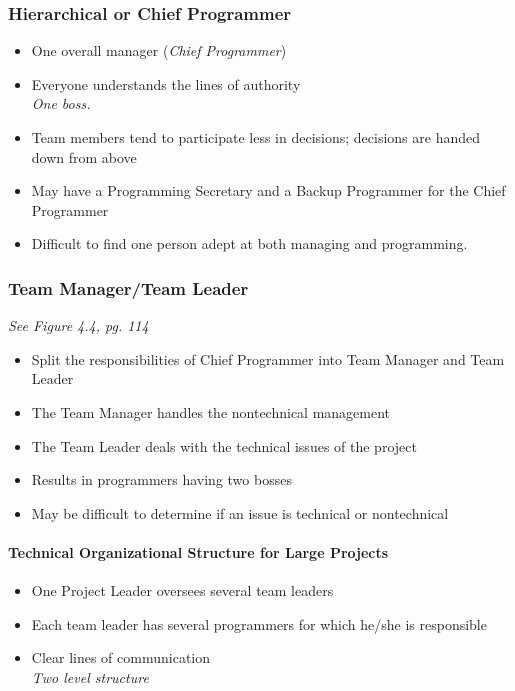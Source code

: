 \documentclass{report}
\begin{document}
				\subsubsection{Hierarchical or Chief Programmer}
					\begin{itemize}
						\item One overall manager (\textit{Chief Programmer})
						\item Everyone understands the lines of authority\\
							\textit{One boss.}
						\item Team members tend to participate less in decisions; decisions are handed down from above
						\item May have a Programming Secretary and a Backup Programmer for the Chief Programmer
						\item Difficult to find one person adept at both managing and programming.
					\end{itemize}
				\subsubsection{Team Manager/Team Leader}
					\textit{See Figure 4.4, pg. 114}
					\begin{itemize}
						\item Split the responsibilities of Chief Programmer into Team Manager and Team Leader
						\item The Team Manager handles the nontechnical management
						\item The Team Leader deals with the technical issues of the project
						\item Results in programmers having two bosses
						\item May be difficult to determine if an issue is technical or nontechnical
					\end{itemize}
					\paragraph{Technical Organizational Structure for Large Projects}
						\begin{itemize}
							\item One Project Leader oversees several team leaders
							\item Each team leader has several programmers for which he/she is responsible
							\item Clear lines of communication\\
								\textit{Two level structure}
						\end{itemize}
\end{document}
